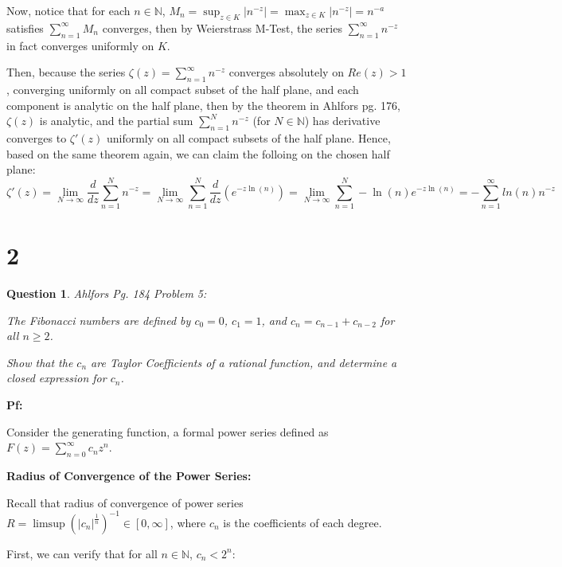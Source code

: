 \documentclass{article}
\newtheorem{question}{Question}
\begin{document}
Now, notice that for each $n\in\mathbb{N}$, $M_n=\sup_{z\in K}|n^{-z}| = \max_{z\in K}|n^{-z}|=n^{-a}$ satisfies $\sum_{n=1}^{\infty}M_n$ converges, then by Weierstrass M-Test,
the series $\sum_{n=1}^{\infty}n^{-z}$ in fact converges uniformly on $K$. 

Then, because the series $\zeta(z)=\sum_{n=1}^{\infty}n^{-z}$ converges absolutely on $Re(z)>1$, converging uniformly on all compact subset of the half plane, and each component is analytic on the half plane,
then by the theorem in Ahlfors pg. 176, $\zeta(z)$ is analytic, and the partial sum $\sum_{n=1}^{N}n^{-z}$ (for $N\in\mathbb{N}$) has derivative converges to  $\zeta'(z)$ uniformly on all compact subsets of the half plane.
Hence, based on the same theorem again, we can claim the folloing on the chosen half plane:
$$\zeta'(z)=\lim_{N\rightarrow\infty}\frac{d}{dz}\sum_{n=1}^{N}n^{-z} = \lim_{N\rightarrow\infty}\sum_{n=1}^{N}\frac{d}{dz}(e^{-z\ln(n)}) = \lim_{N\rightarrow\infty}\sum_{n=1}^{N}-\ln(n)e^{-z\ln(n)} = -\sum_{n=1}^{\infty}ln(n)n^{-z}$$

\hfil

\hfil

\section*{2}
\begin{myBox}[]{}
    \begin{question}
        Ahlfors Pg. 184 Problem 5:

        The Fibonacci numbers are defined by $c_0=0$, $c_1=1$, and $c_n=c_{n-1}+c_{n-2}$ for all $n\geq 2$.
        
        Show that the $c_n$ are Taylor Coefficients of a rational function, and determine a closed expression for $c_n$.
    \end{question}
\end{myBox}

\textbf{Pf:}

Consider the generating function, a formal power series defined as $F(z)=\sum_{n=0}^{\infty}c_nz^n$.

\hfil

\textbf{Radius of Convergence of the Power Series:}

Recall that radius of convergence of power series $R=\limsup(|c_n|^{\frac{1}{n}})^{-1}\in [0,\infty]$, where $c_n$ is the coefficients of each degree.

First, we can verify that for all $n\in\mathbb{N}$, $c_n<2^n$:
\end{document}
